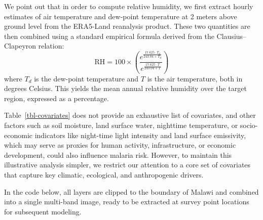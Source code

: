 \documentclass[
  letterpaper,
]{krantz}
\begin{document}
We point out that in order to compute relative humidity, we first
extract hourly estimates of air temperature and dew-point temperature at
2 meters above ground level from the ERA5-Land reanalysis product. These
two quantities are then combined using a standard empirical formula
derived from the Clausius--Clapeyron relation: \[
\text{RH} = 100 \times \left( \frac{e^{\frac{17.625 \cdot T_d}{243.04 + T_d}}}{e^{\frac{17.625 \cdot T}{243.04 + T}}} \right)
\] where \(T_d\) is the dew-point temperature and \(T\) is the air
temperature, both in degrees Celsius. This yields the mean annual
relative humidity over the target region, expressed as a percentage.

Table~\ref{tbl-covariates} does not provide an exhaustive list of
covariates, and other factors such as soil moisture, land surface water,
nighttime temperature, or socio-economic indicators like night-time
light intensity and land surface emissivity, which may serve as proxies
for human activity, infrastructure, or economic development, could also
influence malaria risk. However, to maintain this illustrative analysis
simpler, we restrict our attention to a core set of covariates that
capture key climatic, ecological, and anthropogenic drivers.

In the code below, all layers are clipped to the boundary of Malawi and
combined into a single multi-band image, ready to be extracted at survey
point locations for subsequent modeling.
\end{document}
